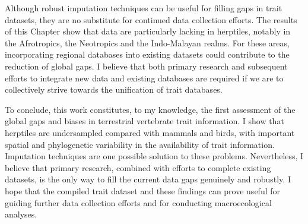Although robust imputation techniques can be useful for filling gaps in trait datasets, they are no substitute for continued data collection efforts. The results of this Chapter show that data are particularly lacking in herptiles, notably in the Afrotropics, the Neotropics and the Indo-Malayan realms. For these areas, incorporating regional databases into existing datasets could contribute to the reduction of global gaps. I believe that both primary research and subsequent efforts to integrate new data and existing databases are required if we are to collectively strive towards the unification of trait databases.

To conclude, this work constitutes, to my knowledge, the first assessment of the global gaps and biases in terrestrial vertebrate trait information. I show that herptiles are undersampled compared with mammals and birds, with important spatial and phylogenetic variability in the availability of trait information. Imputation techniques are one possible solution to these problems. Nevertheless, I believe that primary research, combined with efforts to complete existing datasets, is the only way to fill the current data gaps genuinely and robustly. I hope that the compiled trait dataset and these findings can prove useful for guiding further data collection efforts and for conducting macroecological analyses.

